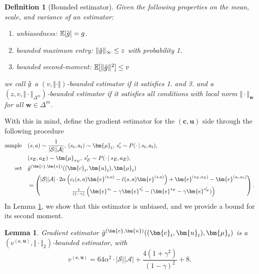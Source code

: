 \documentclass[10pt]{article} %
\newtheorem{lemma}{Lemma}
\newtheorem{definition}{Definition}
\def\Ac{\ensuremath{\mathcal{A}}}
\def\vc{{\bm{c}}}
\def\ve{{\bm{e}}}
\def\vu{{\bm{u}}}
\def\vw{{\bm{w}}}
\def\vmu{{\bm{\mu}}}
\def\evc{{c}}
\newcommand{\E}{\mathbb{E}}
\newcommand{\St}{\mathcal{S}}
\begin{document}
\begin{definition}[Bounded estimator] \label{def:bounded_estimator}
Given the following properties on the mean, scale, and variance of an estimator:
\begin{enumerate}
    \item unbiasedness: $\E[\Tilde{g}] = g$.
    \item bounded maximum entry: $\Vert \Tilde{g} \Vert_\infty \leq z$ with probability 1.
    \item bounded second-moment: $\E[\Vert \Tilde{g} \Vert^2] \leq v$
\end{enumerate}
we call $\Tilde{g}$ a $(v, \Vert \cdot \Vert)$-bounded estimator if it satisfies 1. and 3. and a $(z, v, \Vert \cdot \Vert_{\Delta^m})$-bounded estimator if it satisfies all conditions with local norm $\Vert \cdot \Vert_\vw$ for all $\vw\in\Delta^m$.
\end{definition}

With this in mind, define the gradient estimator for the $(\vc,\vu)$ side through the following procedure
\begin{align}\label{eq:gradCU}\nonumber
    \text{sample}\quad  &(s, a) \sim \frac{1}{|\St||\Ac|},\: (s_t, a_t) \sim \vmu_t, \: s^\prime_t \sim P(\cdot\:|\:s_t,a_t),\: \\
&(s_E, a_E) \sim \vmu_{\pi_E}, \: s^\prime_E \sim P(\cdot\:|\:s_E,a_E), \nonumber \\
    \text{set} \quad & \Tilde{g}^{(\vc,\vu)}((\vc_t,\vu_t),\vmu_t) \\
&= \begin{pmatrix}
                |\St||\Ac|\cdot 2\alpha\left(\evc_t(s,a)\ve^{(s,a)}-\hat{\evc}(s,a)\ve^{(s,a)}\right) + \ve^{(s_E,a_E)} - \ve^{(s_t,a_t)}\vspace{3px} \\\nonumber
                \frac{1}{(1-\gamma)}\left( \ve^{s_t} - \gamma \ve^{s_t^\prime} - (\ve^{s_E} - \gamma\ve^{s_E^\prime})\right)
                \end{pmatrix}.  
\end{align}
In Lemma \ref{lemma:cu_grad}, we show that this estimator is unbiased, and we provide a bound for its second moment.
\begin{lemma} \label{lemma:cu_grad}
    Gradient estimator $\Tilde{g}^{(\vc,\vu)}((\vc_t,\vu_t),\vmu_t)$ is a $(v^{(\vc,\vu)}, \Vert \cdot \Vert_2)$-bounded estimator, with 
    $$v^{(\vc,\vu)} =  64\alpha^2\cdot |\St||\Ac| + \frac{4(1+\gamma^2)}{(1-\gamma)^2} + 8.$$   
\end{lemma}
\end{document}
